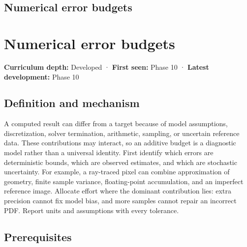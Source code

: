 \hypertarget{appendix-31b8c295e05f}{}
\section*{Numerical error budgets}
\chapter{Numerical error budgets}\label{appendix-31b8c295e05f-numerical-error-budgets}

\textbf{Curriculum depth:} Developed · \textbf{First seen:} Phase 10 · \textbf{Latest development:} Phase 10

\section{Definition and mechanism}\label{appendix-31b8c295e05f-definition-and-mechanism}

A computed result can differ from a target because of model assumptions, discretization, solver termination, arithmetic, sampling, or uncertain reference data. These contributions may interact, so an additive budget is a diagnostic model rather than a universal identity. First identify which errors are deterministic bounds, which are observed estimates, and which are stochastic uncertainty. For example, a ray-traced pixel can combine approximation of geometry, finite sample variance, floating-point accumulation, and an imperfect reference image. Allocate effort where the dominant contribution lies: extra precision cannot fix model bias, and more samples cannot repair an incorrect PDF. Report units and assumptions with every tolerance.

\section{Prerequisites}\label{appendix-31b8c295e05f-prerequisites}

